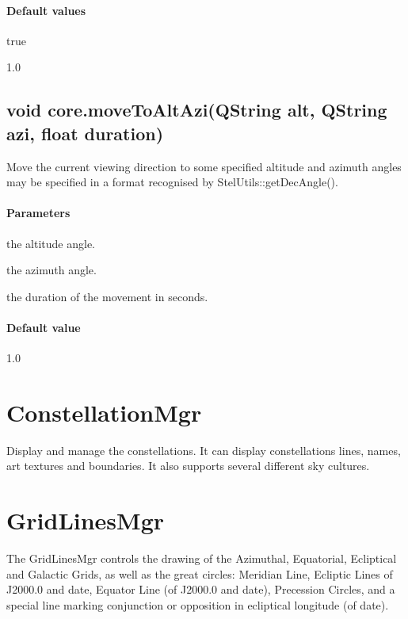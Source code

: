 \paragraph{Default values}
\begin{description}[align=right,labelwidth=3cm,leftmargin=3.2cm]
\item[\parameter{show}] true
\item[\parameter{alpha}] 1.0
\end{description}

\subsection{void core.moveToAltAzi(QString alt, QString azi, float duration)}
\label{sec:ScriptingAPI:core:moveToAltAzi}
Move the current viewing direction to some specified altitude and azimuth angles may be specified in a format recognised by StelUtils::getDecAngle().

\paragraph{Parameters}
\begin{description}[align=right,labelwidth=3cm,leftmargin=3.2cm]
\item[\parameter{alt}] the altitude angle.
\item[\parameter{azi}] the azimuth angle.
\item[\parameter{duration}] the duration of the movement in seconds.
\end{description}

\paragraph{Default value}
\begin{description}[align=right,labelwidth=3cm,leftmargin=3.2cm]
\item[\parameter{duration}] 1.0
\end{description}

\section{ConstellationMgr}
\label{sec:ScriptingAPI:ConstellationMgr}
Display and manage the constellations. It can display constellations lines, names, art textures and boundaries. It also supports several different sky cultures.

\section{GridLinesMgr}
\label{sec:ScriptingAPI:GridLinesMgr}
The GridLinesMgr controls the drawing of the Azimuthal, Equatorial, Ecliptical and Galactic Grids, as well as the great circles: Meridian Line, Ecliptic Lines of J2000.0 and date, Equator Line (of J2000.0 and date), Precession Circles, and a special line marking conjunction or opposition in ecliptical longitude (of date).

